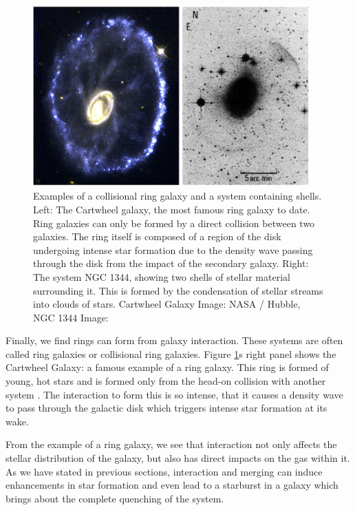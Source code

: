 \begin{figure}
    \centering
    \includegraphics[width=0.95\textwidth]{Introduction/figures/shells-rings.jpg}
    \caption[Examples of a collisional ring galaxy and a system containing shells.]{Examples of a collisional ring galaxy and a system containing shells. Left: The Cartwheel galaxy, the most famous ring galaxy to date. Ring galaxies can only be formed by a direct collision between two galaxies. The ring itself is composed of a region of the disk undergoing intense star formation due to the density wave passing through the disk from the impact of the secondary galaxy. Right: The system NGC 1344, showing two shells of stellar material surrounding it. This is formed by the condensation of stellar streams into clouds of stars. Cartwheel Galaxy Image: NASA / Hubble, NGC 1344 Image: \citet{1983ApJ...274..534M}}
    \label{fig:tidal-features-ex}
\end{figure}

Finally, we find rings can form from galaxy interaction. These systems are often called ring galaxies or collisional ring galaxies. Figure \ref{fig:tidal-features-ex}s right panel shows the Cartwheel Galaxy: a famous example of a ring galaxy. This ring is formed of young, hot stars and is formed only from the head-on collision with another system \citep{1976ApJ...209..382L}. The interaction to form this is so intense, that it causes a density wave to pass through the galactic disk which triggers intense star formation at its wake.

From the example of a ring galaxy, we see that interaction not only affects the stellar distribution of the galaxy, but also has direct impacts on the gas within it. As we have stated in previous sections, interaction and merging can induce enhancements in star formation and even lead to a starburst in a galaxy which brings about the complete quenching of the system.

